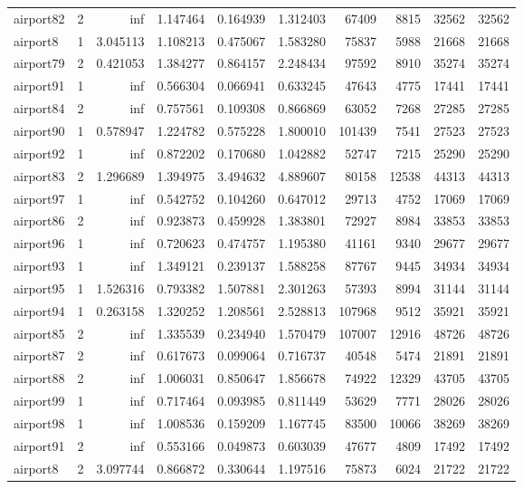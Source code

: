 \begin{longtable}{|l|r|r|r|r|r|r|r|r|r|}
airport82 & 2 & inf & 1.147464 & 0.164939 & 1.312403 & 67409 & 8815 & 32562 & 32562 \\
airport8 & 1 & 3.045113 & 1.108213 & 0.475067 & 1.583280 & 75837 & 5988 & 21668 & 21668 \\
airport79 & 2 & 0.421053 & 1.384277 & 0.864157 & 2.248434 & 97592 & 8910 & 35274 & 35274 \\
airport91 & 1 & inf & 0.566304 & 0.066941 & 0.633245 & 47643 & 4775 & 17441 & 17441 \\
airport84 & 2 & inf & 0.757561 & 0.109308 & 0.866869 & 63052 & 7268 & 27285 & 27285 \\
airport90 & 1 & 0.578947 & 1.224782 & 0.575228 & 1.800010 & 101439 & 7541 & 27523 & 27523 \\
airport92 & 1 & inf & 0.872202 & 0.170680 & 1.042882 & 52747 & 7215 & 25290 & 25290 \\
airport83 & 2 & 1.296689 & 1.394975 & 3.494632 & 4.889607 & 80158 & 12538 & 44313 & 44313 \\
airport97 & 1 & inf & 0.542752 & 0.104260 & 0.647012 & 29713 & 4752 & 17069 & 17069 \\
airport86 & 2 & inf & 0.923873 & 0.459928 & 1.383801 & 72927 & 8984 & 33853 & 33853 \\
airport96 & 1 & inf & 0.720623 & 0.474757 & 1.195380 & 41161 & 9340 & 29677 & 29677 \\
airport93 & 1 & inf & 1.349121 & 0.239137 & 1.588258 & 87767 & 9445 & 34934 & 34934 \\
airport95 & 1 & 1.526316 & 0.793382 & 1.507881 & 2.301263 & 57393 & 8994 & 31144 & 31144 \\
airport94 & 1 & 0.263158 & 1.320252 & 1.208561 & 2.528813 & 107968 & 9512 & 35921 & 35921 \\
airport85 & 2 & inf & 1.335539 & 0.234940 & 1.570479 & 107007 & 12916 & 48726 & 48726 \\
airport87 & 2 & inf & 0.617673 & 0.099064 & 0.716737 & 40548 & 5474 & 21891 & 21891 \\
airport88 & 2 & inf & 1.006031 & 0.850647 & 1.856678 & 74922 & 12329 & 43705 & 43705 \\
airport99 & 1 & inf & 0.717464 & 0.093985 & 0.811449 & 53629 & 7771 & 28026 & 28026 \\
airport98 & 1 & inf & 1.008536 & 0.159209 & 1.167745 & 83500 & 10066 & 38269 & 38269 \\
airport91 & 2 & inf & 0.553166 & 0.049873 & 0.603039 & 47677 & 4809 & 17492 & 17492 \\
airport8 & 2 & 3.097744 & 0.866872 & 0.330644 & 1.197516 & 75873 & 6024 & 21722 & 21722 \\

\end{longtable}
